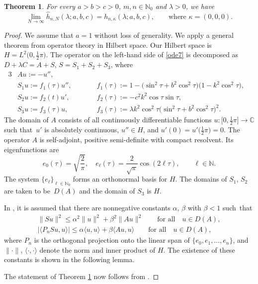 \documentclass[pdftex]{sigma}
\newtheorem{thm}{Theorem}[section]
\newcommand{\C}{\mathbb{C}}
\newcommand{\N}{\mathbb{N}}
\numberwithin{equation}{section}
\begin{document}
\begin{thm}\label{convergence}
For every $a>b>c>0$, $m,n\in\N_0$ and $\lambda>0$, we have
\[ \lim_{N\to\infty} \hat h_{n,N}(\lambda;a,b,c)=h_{n,\kappa}(\lambda;a,b,c),\qquad \text{where $\kappa=(0,0,0)$}.
\]
\end{thm}
\begin{proof}
We assume that $a=1$ without loss of generality. We apply a general theorem \cite[Theorem B.1]{V}
from operator theory in Hilbert space.
Our Hilbert space is $H=L^2\bigl(0,\tfrac12\pi\bigr)$. The operator on the left-hand side of \eqref{ode7}
is decomposed as $D+\lambda C=A+S$, $S=S_1+S_2+S_3$,
where
\begin{alignat*}{3}
& A u:=-u'',&&& \\
&S_1u:=f_1(\tau)u'',\qquad &&f_1(\tau):=1-\bigl(\sin^2\tau+b^2\cos^2\tau\bigr)\bigl(1-k^2\cos^2\tau\bigr),&\\
&S_2u:=f_2(t)u',\qquad&& f_2(\tau):=-c^2k^2\cos\tau\sin\tau,&\\
&S_3u:=f_3(\tau) u,\qquad&& f_3(\tau):=\lambda k^2\cos^2 \tau\bigl(\sin^2\tau+b^2\cos^2\tau\bigr)^2.&
\end{alignat*}
The domain of $A$ consists of all continuously differentiable functions $u\colon \big[0,\frac12\pi\big]\to\C$
such that~$u'$ is absolutely continuous, $u''\in H$, and $u'(0)=u'\bigl(\frac12\pi\bigr)=0$.
The operator $A$ is self-adjoint, positive semi-definite with compact resolvent. Its eigenfunctions are
\[ e_0(\tau)=\sqrt{\frac2\pi},\quad e_\ell(\tau)=\frac{2}{\sqrt\pi}\cos(2\ell\tau),\qquad \ell\in\N.\]
The system $\{e_\ell\}_{\ell\in\N_0}$ forms an orthonormal basis for $H$.
The domains of $S_1$, $S_2$ are taken to be~$D(A)$ and the domain of $S_3$ is $H$.

In \cite[Theorem B.1]{V}, it is assumed that there are nonnegative constants $\alpha$, $\beta$ with $\beta<1$ such~that
\begin{gather}\label{cond1}
\|Su\|^2\le \alpha^2\|u\|^2+\beta^2\|Au\|^2\qquad\text{for all} \quad u\in D(A),\\
|\langle P_nSu,u\rangle|\le \alpha \langle u,u\rangle+\beta\langle Au,u\rangle\qquad \text{for all} \quad u\in D(A),\label{cond2}
\end{gather}
where $P_n$ is the orthogonal projection onto the linear span of $\{e_0,e_1,\dots,e_n\}$,
and $\|\cdot\|$, $\langle \cdot,\cdot\rangle$ denote the norm and inner product of $H$.
The existence of these constants is shown in the following lemma.

The statement of Theorem \ref{convergence} now follows from \cite[Theorems B.1 and B.2]{V}.
\end{proof}
\end{document}
